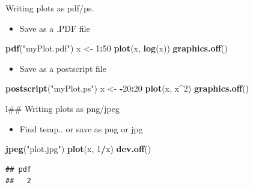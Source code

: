 \documentclass[ignorenonframetext,]{beamer}
\newenvironment{Shaded}{\begin{snugshade}}{\end{snugshade}}
\newcommand{\KeywordTok}[1]{\textcolor[rgb]{0.13,0.29,0.53}{\textbf{#1}}}
\newcommand{\DecValTok}[1]{\textcolor[rgb]{0.00,0.00,0.81}{#1}}
\newcommand{\StringTok}[1]{\textcolor[rgb]{0.31,0.60,0.02}{#1}}
\newcommand{\OperatorTok}[1]{\textcolor[rgb]{0.81,0.36,0.00}{\textbf{#1}}}
\newcommand{\NormalTok}[1]{#1}
\providecommand{\tightlist}{%
  \setlength{\itemsep}{0pt}\setlength{\parskip}{0pt}}
\begin{document}
\begin{frame}[fragile]{Writing plots as pdf/ps.}

\begin{itemize}
\tightlist
\item
  Save as a .PDF file
\end{itemize}

\begin{Shaded}
\begin{Highlighting}[]
\KeywordTok{pdf}\NormalTok{(}\StringTok{"myPlot.pdf"}\NormalTok{)}
\NormalTok{x <-}\StringTok{ }\DecValTok{1}\OperatorTok{:}\DecValTok{50}
\KeywordTok{plot}\NormalTok{(x, }\KeywordTok{log}\NormalTok{(x))}
\KeywordTok{graphics.off}\NormalTok{()}
\end{Highlighting}
\end{Shaded}

\begin{itemize}
\tightlist
\item
  Save as a postscript file
\end{itemize}

\begin{Shaded}
\begin{Highlighting}[]
\KeywordTok{postscript}\NormalTok{(}\StringTok{"myPlot.ps"}\NormalTok{)}
\NormalTok{x <-}\StringTok{ }\OperatorTok{-}\DecValTok{20}\OperatorTok{:}\DecValTok{20}
\KeywordTok{plot}\NormalTok{(x, x}\OperatorTok{^}\DecValTok{2}\NormalTok{)}
\KeywordTok{graphics.off}\NormalTok{()}
\end{Highlighting}
\end{Shaded}

\end{frame}

\begin{frame}[fragile]

l\#\# Writing plots as png/jpeg

\begin{itemize}
\tightlist
\item
  Find temp.. or save as png or jpg
\end{itemize}

\begin{Shaded}
\begin{Highlighting}[]
\KeywordTok{jpeg}\NormalTok{(}\StringTok{"plot.jpg"}\NormalTok{)}
\KeywordTok{plot}\NormalTok{(x, }\DecValTok{1}\OperatorTok{/}\NormalTok{x)}
\KeywordTok{dev.off}\NormalTok{()}
\end{Highlighting}
\end{Shaded}

\begin{verbatim}
## pdf 
##   2
\end{verbatim}

\end{frame}
\end{document}
